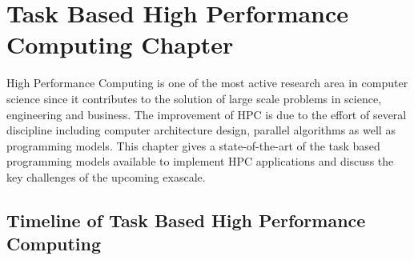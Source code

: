 \chapter{Task Based High Performance Computing Chapter \label{chap:hpc}}
High Performance Computing is one of the most active research area in computer science since it contributes to the solution of large scale problems in science, engineering and business.
The improvement of HPC is due to the effort of several discipline including computer architecture design, parallel algorithms as well as programming models.
This chapter gives a state-of-the-art of the task based programming models available to implement HPC applications and discuss the key challenges of the upcoming exascale.


\section{Timeline of Task Based High Performance Computing}

